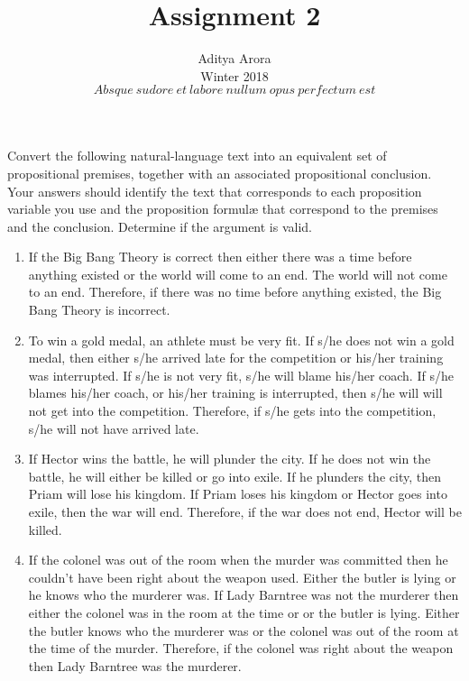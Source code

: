 \documentclass[10.5pt]{article}
\newenvironment{problem}[2][Problem]{\begin{trivlist}
\item[\hskip \labelsep {\bfseries #1}\hskip \labelsep {\bfseries #2.}]}{\end{trivlist}}
\begin{document}

\title{Assignment 2}%
\author{Aditya Arora\\ %
Winter 2018\\$Absque\ sudore\ et\ labore\ nullum\ opus\ perfectum\ est$} %
\maketitle

\begin{problem}{1}
Convert the following natural-language text into an equivalent set of propositional premises, together with an associated propositional conclusion.  Your answers should identify the text that corresponds to each proposition variable you use and the proposition formul{\ae} that correspond to the premises and the conclusion.  Determine if the argument is valid.
\begin{enumerate}
  \parskip=0in
  \parsep=0in
  \itemsep=0in
\item If the Big Bang Theory is correct then either there was a time before anything existed or the world will come to an end.  The world will not come to an end.  Therefore, if there was no time before anything existed, the Big Bang Theory is incorrect.
\item To win a gold medal, an athlete must be very fit.  If s/he does not win a gold medal, then either s/he arrived late for the competition or his/her training was interrupted.  If s/he is not very fit, s/he will blame his/her coach.  If s/he blames his/her coach, or his/her training is interrupted, then s/he will will not get into the competition.  Therefore, if s/he gets into the competition, s/he will not have arrived late.
\item If Hector wins the battle, he will plunder the city.  If he does not win the battle, he will either be killed or go into exile.  If he plunders the city, then Priam will lose his kingdom.  If Priam loses his kingdom or Hector goes into exile, then the war will end.  Therefore, if the war does not end, Hector will be killed.
\item If the colonel was out of the room when the murder was committed then he couldn't have been right about the weapon used.  Either the butler is lying or he knows who the murderer was.  If Lady Barntree was not the murderer then either the colonel was in the room at the time or or the butler is lying.  Either the butler knows who the murderer was or the colonel was out of the room at the time of the murder.  Therefore, if the colonel was right about the weapon then Lady Barntree was the murderer.
\end{enumerate}
\end{problem}
\end{document}

